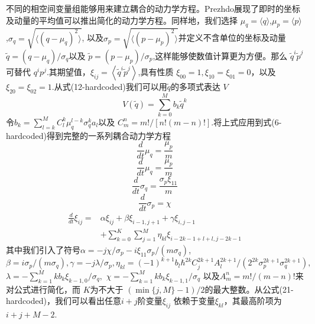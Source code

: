 不同的相空间变量组能够用来建立耦合的动力学方程。Prezhdo展现了即时的坐标及动量的平均值可以推出简化的动力学方程。同样地，我们选择 $\mu_q=\langle q \rangle $,$\mu_p = \langle p \rangle $,$\sigma_q = \sqrt{\langle (q-\mu_q)^2 \rangle }$, 以及$\sigma_p = \sqrt{\langle (p-\mu_p)^2 \rangle }$并定义不含单位的坐标及动量 $\tilde{q}=\left(q-\mu_{q}\right) / \sigma_{q}$以及 $\tilde{p}=\left(p-\mu_{p}\right) / \sigma_{p}$,这样能够使数值计算更为方便。那么 $\tilde{q}^{i} \tilde{p}^{j}$可替代 $q^{i} p^{j}$.其期望值，$\xi_{i j}=\left\langle\tilde{q}^{i} \tilde{p}^{j}\right\rangle$,具有性质 $\xi_{00}=1, \xi_{10}=\xi_{01}=0$，以及 $\xi_{20}=\xi_{02}=1$.从式(12-hardcoded)我们可以用$\tilde{q}$的多项式表达 $V$ 
\begin{equation}
	V(\tilde{q})=\sum_{k=0}^{M} b_{k} \tilde{q}^{k}
\end{equation}
令$b_{k}=\sum_{l=k}^{M} C_{l}^{k} \mu_{q}^{l-k} \sigma_{q}^{k} a_{l}$以及 $C_{m}^{n}=m ! /[n !(m-n) !]$.将上式应用到式(6-hardcoded)得到完整的一系列耦合动力学方程
\begin{equation}
	\frac{d}{d t} \mu_{q}=\frac{\mu_{p}}{m}
	\label{muq}
\end{equation}
\begin{equation}
	\frac{d}{d t} \mu_{q}=\frac{\mu_{p}}{m}
\end{equation}
\begin{equation}
	\frac{d}{d t} \sigma_{q}=\frac{\sigma_{p} \xi_{11}}{m}
\end{equation}
\begin{equation}
	\frac{d}{d t} \sigma_{p}=\chi
\end{equation}
\begin{equation}
	\begin{aligned} \frac{d}{d t} \xi_{i j}=& \alpha \xi_{i j}+\beta \xi_{i-1, j+1}+\gamma \xi_{i, j-1} \\ &+\sum_{k=0}^{K} \sum_{j=1}^{M} \eta_{k l} \xi_{i-2 k-1+l+l, j-2 k-1} \end{aligned}
	\label{dimensionless}
\end{equation}
其中我们引入了符号$\alpha=-j \chi / \sigma_{p}-i \xi_{11} \sigma_{p} / (m\sigma_q)$,$\beta=i \sigma_{p} /\left(m \sigma_{q}\right), \gamma=-j \lambda / \sigma_{p}, \eta_{k l}=(-1)^{k+1} b_{l}\hbar^{2 k} C_{j}^{2 k+1} A_{l}^{2 k+1} /\left(2^{2 k} \sigma_{p}^{2 k+1} \sigma_{q}^{2 k+1}\right),$ $\lambda=-\sum_{k=1}^{M} k b_{k} \xi_{k-1,0} / \sigma_{q},$ $\chi=-\sum_{k=1}^{M} k b_{k} \xi_{k-1,1} / \sigma_{q}$ 以及$A_{m}^{n}=m ! /(m-n) !$来对公式进行简化，而 $K$为不大于 $(\min \{j, M\}-1) / 2$的最大整数。从公式(21-hardcoded)，我们可以看出任意$i+j$阶变量$\xi_{ij}$ 依赖于变量$\xi_{kl}$，其最高阶项为 $i+j+M-2$.

